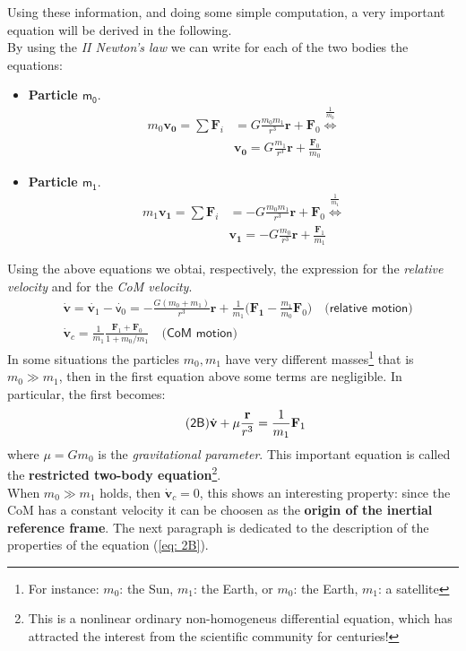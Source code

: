 Using these information, and doing some simple computation, a very important equation will be derived in the following.\\
By using the \textit{II Newton's law} we can write for each of the two bodies the equations: 
\begin{itemize}
    \item[\ding{202}] \textsf{\textbf{Particle $\mathsf{m_0}$}}. \begin{align*}
        m_0 \mathbf{v_0} = \sum{\mathbf{F}_i} &= G\frac{m_0m_1}{r^3}\mathbf{r} + \mathbf{F}_0 \overset{\frac{1}{m_0}}{\iff}\\
        &\mathbf{v_0} = G\frac{m_1}{r^3}\mathbf{r} + \frac{\mathbf{F}_0}{m_0}
    \end{align*}
    \item[\ding{203}] \textsf{\textbf{Particle $\mathsf{m_1}$}}.
    \begin{align*}
        m_1 \mathbf{v_1} = \sum{\mathbf{F}_i} &= -G\frac{m_0m_1}{r^3}\mathbf{r} + \mathbf{F}_0 \overset{\frac{1}{m_1}}{\iff}\\
        &\mathbf{v_1} =- G\frac{m_0}{r^3}\mathbf{r} + \frac{\mathbf{F}_1}{m_1}
    \end{align*}
\end{itemize}
Using the above equations we obtai, respectively, the expression for the \textit{relative velocity} and for the \textit{CoM velocity}.
\begin{align*}
    &\dot{\mathbf{v}}=\dot{\mathbf{v}_1} - \dot{\mathsf{v}_0} =- \frac{G(m_0+m_1)}{r^3}\mathbf{r} + \frac{1}{m_1} \biggl(
        \mathbf{F_1}-\frac{m_1}{m_0}\mathbf{F}_0 
    \biggr) \quad \textsf{(relative motion)}\\
    &\dot{\mathbf{v}}_c = \frac{1}{m_1} \frac{\mathbf{F}_1 + \mathbf{F}_0} {1+m_0/m_1} \quad \textsf{(CoM motion)}
\end{align*}
In some situations the particles $m_0, m_1$ have very different masses{\footnote[5]{ For instance: $m_0$: the Sun, $m_1$: the Earth, or $m_0$: the Earth, $m_1$: a satellite }} that is $m_0 \gg m_1$, then in the first equation above some terms are negligible. In particular, the first becomes:
\begin{equation} \tag{\textsf{2B}} \label{eq: 2B}
    \dot{\mathbf{v}} + \mu \frac{\mathbf{r}}{r^3} = \frac{1}{m_1} \mathbf{F}_1
\end{equation}
where $\mu=Gm_0$ is the \textit{gravitational parameter}. This important equation is called the \textbf{restricted two-body equation}{\footnote[6]{This is a nonlinear ordinary non-homogeneus differential equation, which has attracted the interest from the scientific community for centuries!}}.\\
When $m_0 \gg m_1$ holds, then $\mathbf{\dot{v}}_c=0$, this shows an interesting property: since the CoM has a constant velocity it can be choosen as the \textbf{origin of the inertial reference frame}. The next paragraph is dedicated to the  description of the properties of the equation (\ref{eq: 2B}).
 
